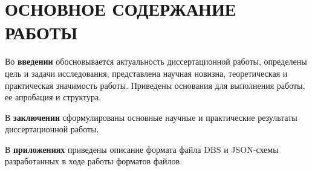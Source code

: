 
\section*{ОСНОВНОЕ СОДЕРЖАНИЕ РАБОТЫ}
Во {\bf введении}
обосновывается актуальность диссертационной работы,
определены цель и задачи исследования,
представлена научная новизна, теоретическая и практическая значимость работы.
Приведены основания для выполнения работы, ее апробация и структура.







В {\bf заключении}
сформулированы основные научные и практические результаты
диссертационной работы.

В {\bf приложениях}
приведены
описание формата файла DBS
и JSON-схемы разработанных
в ходе работы форматов файлов.

